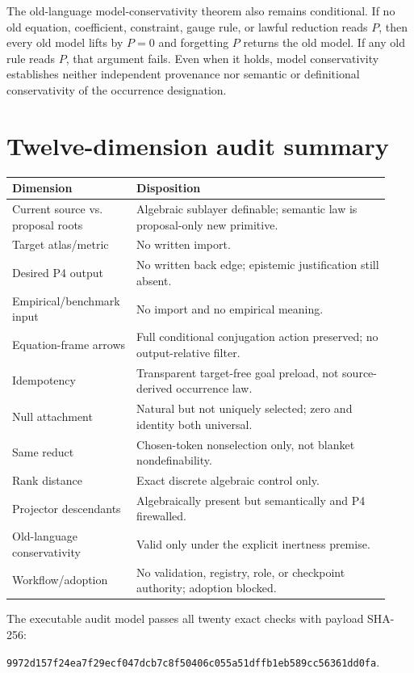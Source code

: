 \documentclass[11pt]{article}
\begin{document}
The old-language model-conservativity theorem also remains conditional. If no
old equation, coefficient, constraint, gauge rule, or lawful reduction reads
$P$, then every old model lifts by $P=0$ and forgetting $P$ returns the old
model. If any old rule reads $P$, that argument fails. Even when it holds,
model conservativity establishes neither independent provenance nor semantic
or definitional conservativity of the occurrence designation.

\section{Twelve-dimension audit summary}

\begin{longtable}{p{0.29\linewidth}p{0.64\linewidth}}
\toprule
Dimension & Disposition \\
\midrule
Current source vs. proposal roots & Algebraic sublayer definable; semantic law
is proposal-only new primitive. \\
Target atlas/metric & No written import. \\
Desired P4 output & No written back edge; epistemic justification still absent. \\
Empirical/benchmark input & No import and no empirical meaning. \\
Equation-frame arrows & Full conditional conjugation action preserved; no
output-relative filter. \\
Idempotency & Transparent target-free goal preload, not source-derived
occurrence law. \\
Null attachment & Natural but not uniquely selected; zero and identity both
universal. \\
Same reduct & Chosen-token nonselection only, not blanket nondefinability. \\
Rank distance & Exact discrete algebraic control only. \\
Projector descendants & Algebraically present but semantically and P4
firewalled. \\
Old-language conservativity & Valid only under the explicit inertness premise. \\
Workflow/adoption & No validation, registry, role, or checkpoint authority;
adoption blocked. \\
\bottomrule
\end{longtable}

The executable audit model passes all twenty exact checks with payload SHA-256:
\begin{center}
\texttt{9972d157f24ea7f29ecf047dcb7c8f50406c055a51dffb1eb589cc56361dd0fa}.
\end{center}
\end{document}
